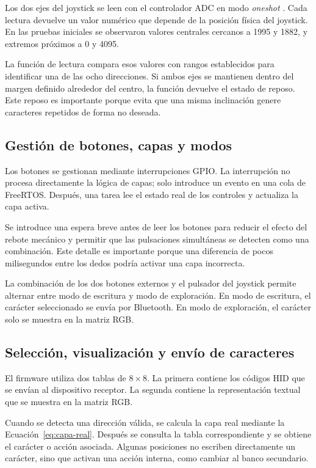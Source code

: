 Los dos ejes del joystick se leen con el controlador ADC en modo \textit{oneshot} \cite{espressifADCOneshot}. Cada lectura devuelve un valor numérico que depende de la posición física del joystick. En las pruebas iniciales se observaron valores centrales cercanos a 1995 y 1882, y extremos próximos a 0 y 4095.

La función de lectura compara esos valores con rangos establecidos para identificar una de las ocho direcciones. Si ambos ejes se mantienen dentro del margen definido alrededor del centro, la función devuelve el estado de reposo. Este reposo es importante porque evita que una misma inclinación genere caracteres repetidos de forma no deseada.

\subsection{Gestión de botones, capas y modos}
\label{subsec:gestion-botones-capas-nuevo}

Los botones se gestionan mediante interrupciones GPIO. La interrupción no procesa directamente la lógica de capas; solo introduce un evento en una cola de FreeRTOS. Después, una tarea lee el estado real de los controles y actualiza la capa activa.

Se introduce una espera breve antes de leer los botones para reducir el efecto del rebote mecánico y permitir que las pulsaciones simultáneas se detecten como una combinación. Este detalle es importante porque una diferencia de pocos milisegundos entre los dedos podría activar una capa incorrecta.

La combinación de los dos botones externos y el pulsador del joystick permite alternar entre modo de escritura y modo de exploración. En modo de escritura, el carácter seleccionado se envía por Bluetooth. En modo de exploración, el carácter solo se muestra en la matriz RGB.

\subsection{Selección, visualización y envío de caracteres}
\label{subsec:seleccion-visualizacion-envio-nuevo}

El firmware utiliza dos tablas de \(8 \times 8\). La primera contiene los códigos HID que se envían al dispositivo receptor. La segunda contiene la representación textual que se muestra en la matriz RGB.

Cuando se detecta una dirección válida, se calcula la capa real mediante la Ecuación~\ref{eq:capa-real}. Después se consulta la tabla correspondiente y se obtiene el carácter o acción asociada. Algunas posiciones no escriben directamente un carácter, sino que activan una acción interna, como cambiar al banco secundario.

